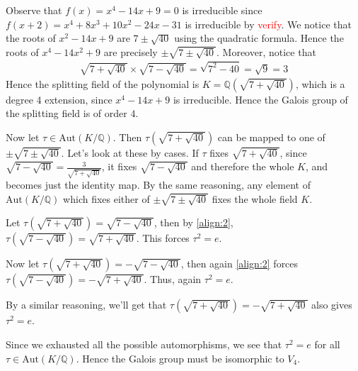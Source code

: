 \documentclass[12pt]{exam}
\theoremstyle{plain} %
\theoremstyle{definition} %
\theoremstyle{remark} %
\begin{document}
\begin{questions}
    \question
    \begin{solution}
      Observe that $f(x) = x^4 - 14x + 9 = 0$ is irreducible since $f(x
      + 2) = x^4 + 8x^3 + 10x^2 - 24x - 31$ is irreducible by
      \textcolor{red}{verify}.
      We notice that the roots of $x^2
      - 14x + 9$ are $7 \pm \sqrt{40}$
      using the quadratic formula. Hence the roots of $x^4 - 14x^2 + 9$
      are precisely $\pm \sqrt{7 \pm \sqrt{40}}$. Moreover, notice that
      \begin{align}
        \label{align:2}
        \sqrt{7 + \sqrt{40}} \times \sqrt{7 - \sqrt{40}} = \sqrt{7^2 -
        40} = \sqrt{9} = 3
      \end{align}
      Hence the splitting field of the polynomial is
      $K = \mathbb{Q}(\sqrt{7 + \sqrt{40}})$, which is a degree 4
      extension, since $x^4 - 14x + 9$ is irreducible. Hence
      the Galois group of the splitting field is of order $4$.

      Now let $\tau \in \textrm{Aut}(K/\mathbb{Q})$. Then $\tau(\sqrt{7
      + \sqrt{40}})$ can be mapped to one of $\pm \sqrt{7 \pm
      \sqrt{40}}$. Let's look at these by cases. If $\tau$ fixes
      $\sqrt{7 + \sqrt{40}}$, since $\sqrt{7 - \sqrt{40}} =
      \frac{3}{\sqrt{7 + \sqrt{40}}}$, it fixes $\sqrt{7 - \sqrt{40}}$
      and therefore the whole $K$, and becomes just the identity map.
      By the same reasoning, any element of
      $\textrm{Aut}(K/\mathbb{Q})$ which fixes either of $\pm \sqrt{7
      \pm \sqrt{40}}$ fixes the whole field $K$.

      Let $\tau(\sqrt{7 + \sqrt{40}}) =\sqrt{7 - \sqrt{40}}$, then by
      \autoref{align:2}, $\tau(\sqrt{7 - \sqrt{40}}) =\sqrt{7 +
      \sqrt{40}}$. This forces $\tau^2 = e$.

      Now let $\tau(\sqrt{7 + \sqrt{40}}) = -\sqrt{7 - \sqrt{40}}$,
      then again \autoref{align:2} forces $\tau(\sqrt{7 - \sqrt{40}}) =
      -\sqrt{7 + \sqrt{40}}$. Thus, again $\tau^2 = e$.

      By a similar reasoning, we'll get that $\tau(\sqrt{7 +
      \sqrt{40}}) = -\sqrt{7 + \sqrt{40}}$ also gives $\tau^2 = e$.

      Since we exhausted all the possible automorphisms, we see that
      $\tau^2 = e$ for all $\tau \in \textrm{Aut}(K/\mathbb{Q})$. Hence
      the Galois group must be isomorphic to $V_4$.
    \end{solution}


\end{questions}
\end{document}
